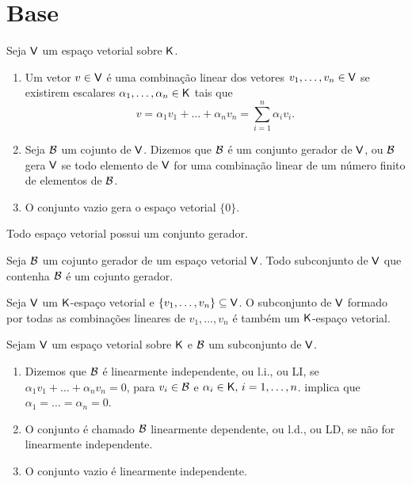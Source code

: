 \documentclass[10pt,a4paper]{book}
\begin{document}
\section{Base}
\begin{definition}
	Seja $\mathsf{ V }$ um espaço vetorial sobre $\mathsf{ K }$.
	\begin{enumerate}
		\item Um vetor $v \in \mathsf{ V }$ é uma combinação linear dos vetores $v_1, \dots, v_n \in \mathsf{ V }$ se existirem escalares $\alpha_1, \dots, \alpha_n \in \mathsf{ K }$ tais que
		\[
			v = \alpha_1 v_1 + \dots + \alpha_n v_n = \sum_{i = 1}^{n} \alpha_i v_i.
		\]
		\item Seja $\mathcal{ B }$ um cojunto de $\mathsf{ V }$. Dizemos que $\mathcal{ B }$ é um conjunto gerador de $\mathsf{ V }$, ou $\mathcal{ B }$ gera $\mathsf{ V }$ se todo elemento de $\mathsf{ V }$ for uma combinação linear de um número finito de elementos de $\mathcal{ B }$.
		\item O conjunto vazio gera o espaço vetorial $\{0\}$.
	\end{enumerate}
\end{definition}

\begin{lemma}
	Todo espaço vetorial possui um conjunto gerador.
\end{lemma}

\begin{lemma}
	Seja $\mathcal{ B }$ um cojunto gerador de um espaço vetorial $\mathsf{ V }$. Todo subconjunto de $\mathsf{ V }$ que contenha $\mathcal{ B }$ é um cojunto gerador.
\end{lemma}

\begin{lemma}
	Seja $\mathsf{ V }$ um $\mathsf{ K }$-espaço vetorial e $\{v_1, \dots, v_n\} \subseteq \mathsf{ V }$. O subconjunto de $\mathsf{ V }$ formado por todas as combinações lineares de $v_1, \dots, v_n$ é também um $\mathsf{ K }$-espaço vetorial.
\end{lemma}

\begin{definition}
	Sejam $\mathsf{ V }$ um espaço vetorial sobre $\mathsf{ K }$ e $\mathcal{ B }$ um subconjunto de $\mathsf{ V }$.
	
	\begin{enumerate}
		\item Dizemos que $\mathcal{ B }$ é linearmente independente, ou l.i., ou LI, se $\alpha_1 v_1 + \dots + \alpha_n v_n = 0$, para $v_i \in \mathcal{ B }$ e $\alpha_i \in \mathsf{ K }, \, i = 1, \dots, n$. implica que $\alpha_1 = \dots = \alpha_n = 0$.
		\item O conjunto é chamado $\mathcal{ B }$ linearmente dependente, ou l.d., ou LD, se não for linearmente independente.
		\item O conjunto vazio é linearmente independente.
	\end{enumerate}
\end{definition}
\end{document}
